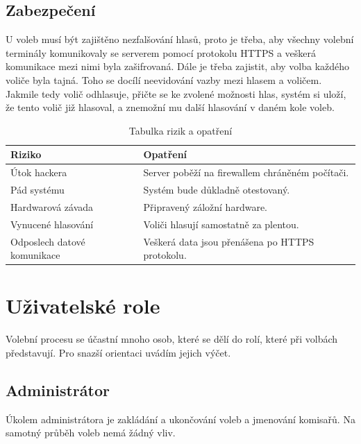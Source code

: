 \documentclass[11pt,twoside,a4paper]{book}
\begin{document}
\subsection{Zabezpečení}

U voleb musí být zajištěno nezfalšování hlasů, proto je třeba, aby všechny volební terminály komunikovaly se serverem pomocí protokolu HTTPS a veškerá komunikace mezi nimi byla zašifrovaná. Dále je třeba zajistit, aby volba každého voliče byla tajná. Toho se docílí neevidování vazby mezi hlasem a voličem. Jakmile tedy volič odhlasuje, přičte se ke zvolené možnosti hlas, systém si uloží, že tento volič již hlasoval, a znemožní mu další hlasování v daném kole voleb.

\begin{table}[h!]
	\begin{center}	
		\begin{tabular}{|l|l|}
		\hline		
		\textbf{Riziko} & \textbf{Opatření} \\
		\hline
		Útok hackera & Server poběží na firewallem chráněném počítači. \\
		\hline		
		Pád systému & Systém bude důkladně otestovaný. \\
		\hline
		Hardwarová závada & Připravený záložní hardware. \\
		\hline
		Vynucené hlasování & Voliči hlasují samostatně za plentou. \\
		\hline
		Odposlech datové komunikace & Veškerá data jsou přenášena po HTTPS protokolu. \\
		\hline
		\end{tabular}		
	\end{center}
	\caption{Tabulka rizik a opatření}
	\label{tab:rizika}
\end{table}

\section{Uživatelské role}

Volební procesu se účastní mnoho osob, které se dělí do rolí, které při volbách představují. Pro snazší orientaci uvádím jejich výčet.

\subsection{Administrátor}

Úkolem administrátora je zakládání a ukončování voleb a jmenování komisařů. Na samotný průběh voleb nemá žádný vliv. 
\end{document}
